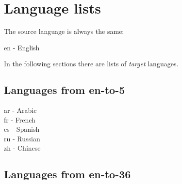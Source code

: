 \section{Language lists}

The source language is always the same:

en - English

In the following sections there are lists of \emph{target}
languages.

\subsection{Languages from \gls{en-to-5}}
\label{att:list_en-to-5}
\noindent
ar - Arabic \\
fr - French \\
es - Spanish \\
ru - Russian \\
zh - Chinese \\

\subsection{Languages from \gls{en-to-36}}
\label{att:list_en-to-36}


